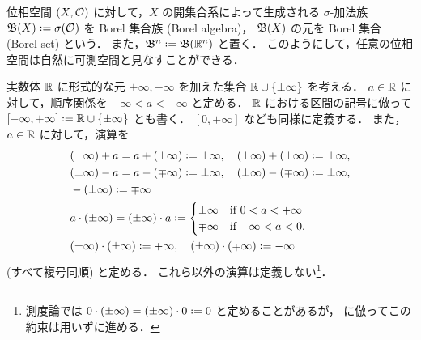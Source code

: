 \begin{example}\label{ex:Borel_algebra}
    位相空間 $(X,\mathcal{O})$ に対して，$X$ の開集合系によって生成される $\sigma$-加法族
    $\Bfrak(X)\defeq\sigma(\Ocal)$ を Borel 集合族 (Borel algebra)，
    $\mathfrak{B}(X)$ の元を Borel 集合 (Borel set) という．
    また，$\Bfrak^n\defeq\Bfrak(\Rbb^n)$ と置く．
    このようにして，任意の位相空間は自然に可測空間と見なすことができる．
\end{example}

\begin{example}\label{ex:extended_real}
    実数体 $\mathbb{R}$ に形式的な元 $+\infty,-\infty$ を加えた集合 $\mathbb{R}\cup\{\pm\infty\}$ を考える．
    $a\in\mathbb{R}$ に対して，順序関係を $-\infty<a<+\infty$ と定める．
    $\mathbb{R}$ における区間の記号に倣って $[-\infty,+\infty]\defeq\Rbb\cup\{\pm\infty\}$ とも書く．
    $[0,+\infty]$ なども同様に定義する．
    また，$a\in\mathbb{R}$ に対して，演算を
    \begin{align*}
        &(\pm\infty)+a=a+(\pm\infty)\defeq\pm\infty,\quad
        (\pm\infty)+(\pm\infty)\defeq\pm\infty,\\
        &(\pm\infty)-a=a-(\mp\infty)\defeq\pm\infty,\quad
        (\pm\infty)-(\mp\infty)\defeq\pm\infty,\\
        &-(\pm\infty)\defeq\mp\infty\\
        &a\cdot(\pm\infty)=(\pm\infty)\cdot a\defeq\begin{cases}
            \pm\infty&\text{if $0<a<+\infty$}\\
            \mp\infty&\text{if $-\infty<a<0$},
        \end{cases}\\
        &(\pm\infty)\cdot(\pm\infty)\defeq+\infty,\quad
        (\pm\infty)\cdot(\mp\infty)\defeq-\infty
    \end{align*}
    (すべて複号同順) と定める．
    これら以外の演算は定義しない\footnote{測度論では $0\cdot(\pm\infty)=(\pm\infty)\cdot0\defeq0$ と定めることがあるが，\cite[p.12]{It63} に倣ってこの約束は用いずに進める．}．


\end{example}
